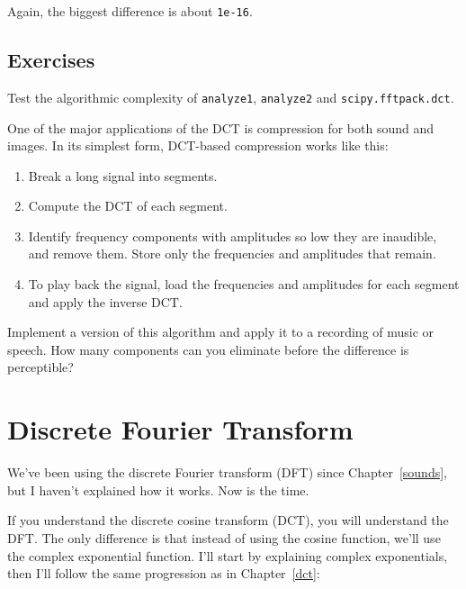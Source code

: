 \documentclass[12pt]{book}
\begin{document}
Again, the biggest difference is about {\tt 1e-16}.


\section{Exercises}

\begin{exercise}
Test the algorithmic complexity of {\tt analyze1}, {\tt analyze2}
and {\tt scipy.fftpack.dct}.
\end{exercise}

\begin{exercise}
One of the major applications of the DCT is compression for both
sound and images.  In its simplest form, DCT-based compression
works like this:

\begin{enumerate}

\item Break a long signal into segments.

\item Compute the DCT of each segment.

\item Identify frequency components with amplitudes so low they are
  inaudible, and remove them.  Store only the frequencies and
  amplitudes that remain.

\item To play back the signal, load the frequencies and amplitudes
  for each segment and apply the inverse DCT.

\end{enumerate}

Implement a version of this algorithm and apply it to a recording
of music or speech.  How many components can you eliminate before
the difference is perceptible?

\end{exercise}



\chapter{Discrete Fourier Transform}
\label{dft}

We've been using the discrete Fourier transform (DFT) since
Chapter~\ref{sounds}, but I haven't explained how it works.  Now is
the time.

If you understand the discrete cosine transform (DCT), you will
understand the DFT.  The only difference is that instead of using the
cosine function, we'll use the complex exponential function.  I'll
start by explaining complex exponentials, then I'll follow the
same progression as in Chapter~\ref{dct}:
\end{document}
